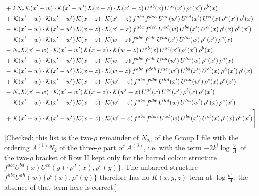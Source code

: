 \documentclass[9pt]{article}
\numberwithin{equation}{section}
\begin{document}
\begin{align}
& +2\,N_{c}\,\mathcal{K}(x'-w)\cdot\mathcal{K}(x'-w')\,\mathcal{K}(x-z)\cdot\mathcal{K}(x'-z)\,U^{ab}(x)\,U^{ac}(x')\,\rho^{c}(x')\,\rho^{b}(x)\notag\\
& +\,\mathcal{K}(x'-w)\cdot\mathcal{K}(x'-w')\,\mathcal{K}(x-z)\cdot\mathcal{K}(x'-z)\,f^{abc}\,f^{deh}\,U^{ae}(w')\,U^{bd}(x')\,U^{cl}(x)\,\rho^{h}(x')\,\rho^{l}(x)\notag\\
& -\,\mathcal{K}(x'-w)\cdot\mathcal{K}(x'-w')\,\mathcal{K}(x-z)\cdot\mathcal{K}(x'-z)\,f^{abc}\,f^{deh}\,U^{ad}(w)\,U^{be}(x')\,U^{cl}(x)\,\rho^{l}(x)\,\rho^{h}(x')\notag\\
& -\,\mathcal{K}(x'-w)\cdot\mathcal{K}(x'-w')\,\mathcal{K}(x-z)\cdot\mathcal{K}(w-z)\,f^{abc}\,f^{bde}\,U^{hd}(x')\,U^{ha}(w)\,\rho^{e}(x')\,\rho^{c}(x)\notag\\
& -N_{c}\,\mathcal{K}(x'-w)\cdot\mathcal{K}(x'-w')\,\mathcal{K}(x-z)\cdot\mathcal{K}(w-z)\,U^{ab}(x)\,U^{ac}(x')\,\rho^{c}(x')\,\rho^{b}(x)\notag\\
& +\,\mathcal{K}(x'-w)\cdot\mathcal{K}(x'-w')\,\mathcal{K}(x-z)\cdot\mathcal{K}(w-z)\,f^{abc}\,f^{bde}\,U^{hd}(w')\,U^{ha}(w)\,\rho^{e}(x')\,\rho^{c}(x)\notag\\
& -\,\mathcal{K}(x'-w)\cdot\mathcal{K}(x'-w')\,\mathcal{K}(x-z)\cdot\mathcal{K}(w-z)\,f^{abc}\,f^{deh}\,U^{ae}(w')\,U^{bd}(x')\,U^{cl}(x)\,\rho^{h}(x')\,\rho^{l}(x)\notag\\
& +\,\mathcal{K}(x'-w)\cdot\mathcal{K}(x'-w')\,\mathcal{K}(x-z)\cdot\mathcal{K}(w'-z)\,f^{abc}\,f^{dbe}\,U^{hd}(x')\,U^{ha}(w')\,\rho^{c}(x)\,\rho^{e}(x')\notag\\
& -N_{c}\,\mathcal{K}(x'-w)\cdot\mathcal{K}(x'-w')\,\mathcal{K}(x-z)\cdot\mathcal{K}(w'-z)\,U^{ab}(x)\,U^{ac}(x')\,\rho^{b}(x)\,\rho^{c}(x')\notag\\
& -\,\mathcal{K}(x'-w)\cdot\mathcal{K}(x'-w')\,\mathcal{K}(x-z)\cdot\mathcal{K}(w'-z)\,f^{abc}\,f^{dbe}\,U^{hd}(w)\,U^{ha}(w')\,\rho^{c}(x)\,\rho^{e}(x')\notag\\
& +\,\mathcal{K}(x'-w)\cdot\mathcal{K}(x'-w')\,\mathcal{K}(x-z)\cdot\mathcal{K}(w'-z)\,f^{abc}\,f^{deh}\,U^{ad}(w)\,U^{be}(x')\,U^{cl}(x)\,\rho^{l}(x)\,\rho^{h}(x') \Bigg]
\end{align} {\color{red}[Checked: this list is the two-$\rho$ remainder of $N_{2a}$ of the Group I file with the ordering $A^{(1)}N_{2}$ of the three-$\rho$ part of $A^{(3)}$, i.e. with the term $-2k^{i}\log\frac{\vee}{\Lambda}$ of the two-$\rho$ bracket of Row II kept only for the barred colour structure $f^{abc}U^{bd}(x)U^{ce}(y)\{\rho^{d}(x),\rho^{e}(y)\}$. The unbarred structure $f^{hbc}U^{ah}(w)\{\rho^{b}(x),\rho^{c}(y)\}$ therefore has no $K(x,y,z)$ term at $\log\frac{k^{+}}{\Lambda}$; the absence of that term here is correct.]}\par\noindent
\end{document}
